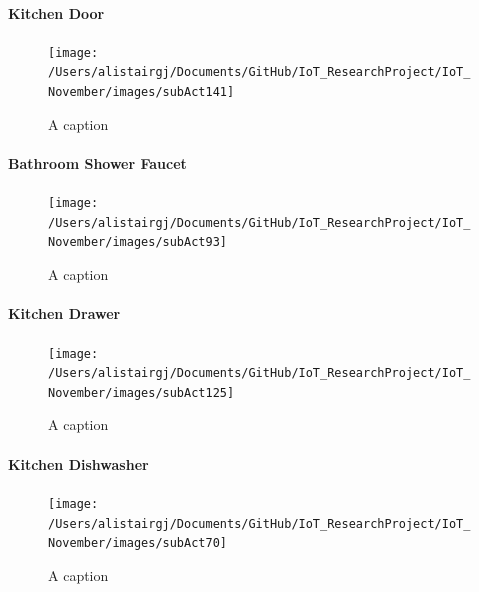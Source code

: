 \documentclass[11pt,]{article}
\let\oldparagraph\paragraph
\renewcommand{\paragraph}[1]{\oldparagraph{#1}\mbox{}}
\begin{document}
\hypertarget{kitchen-door}{%
\paragraph{Kitchen Door}\label{kitchen-door}}

\begin{figure}[H]

{\centering \texttt{[image: /Users/alistairgj/Documents/GitHub/IoT\_ResearchProject/IoT\_November/images/subAct141]} 

}

\caption{A caption}\label{fig:subAct141}
\end{figure}

\hypertarget{bathroom-shower-faucet}{%
\paragraph{Bathroom Shower Faucet}\label{bathroom-shower-faucet}}

\begin{figure}[H]

{\centering \texttt{[image: /Users/alistairgj/Documents/GitHub/IoT\_ResearchProject/IoT\_November/images/subAct93]} 

}

\caption{A caption}\label{fig:subAct93}
\end{figure}

\hypertarget{kitchen-drawer}{%
\paragraph{Kitchen Drawer}\label{kitchen-drawer}}

\begin{figure}[H]

{\centering \texttt{[image: /Users/alistairgj/Documents/GitHub/IoT\_ResearchProject/IoT\_November/images/subAct125]} 

}

\caption{A caption}\label{fig:subAct125}
\end{figure}

\hypertarget{kitchen-dishwasher}{%
\paragraph{Kitchen Dishwasher}\label{kitchen-dishwasher}}

\begin{figure}[H]

{\centering \texttt{[image: /Users/alistairgj/Documents/GitHub/IoT\_ResearchProject/IoT\_November/images/subAct70]} 

}

\caption{A caption}\label{fig:subAct70}
\end{figure}
\end{document}
